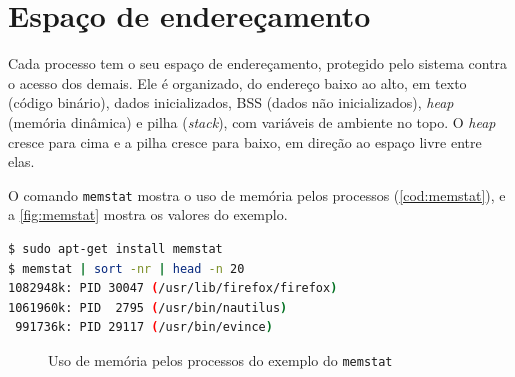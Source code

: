 \section{Espaço de endereçamento}

Cada processo tem o seu espaço de endereçamento, protegido pelo sistema contra o acesso dos demais. Ele é organizado, do endereço baixo ao alto, em texto (código binário), dados inicializados, BSS (dados não inicializados), \textit{heap} (memória dinâmica) e pilha (\textit{stack}), com variáveis de ambiente no topo. O \textit{heap} cresce para cima e a pilha cresce para baixo, em direção ao espaço livre entre elas.

O comando \texttt{memstat} mostra o uso de memória pelos processos (\autoref{cod:memstat}), e a \autoref{fig:memstat} mostra os valores do exemplo.

\begin{lstlisting}[language=bash, caption={Uso de memória por processo com \texttt{memstat}}, label={cod:memstat}]
$ sudo apt-get install memstat
$ memstat | sort -nr | head -n 20
1082948k: PID 30047 (/usr/lib/firefox/firefox)
1061960k: PID  2795 (/usr/bin/nautilus)
 991736k: PID 29117 (/usr/bin/evince)
\end{lstlisting}

\begin{figure}[H]
  \centering
  \caption{Uso de memória pelos processos do exemplo do \texttt{memstat}}\label{fig:memstat}
\end{figure}

